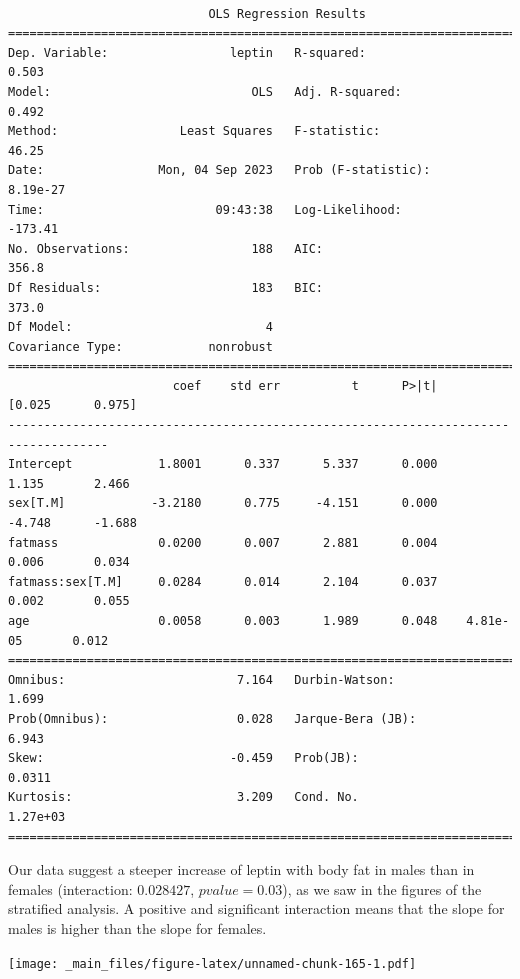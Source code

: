 \documentclass[
]{book}
\begin{document}
\begin{verbatim}

                            OLS Regression Results                            
==============================================================================
Dep. Variable:                 leptin   R-squared:                       0.503
Model:                            OLS   Adj. R-squared:                  0.492
Method:                 Least Squares   F-statistic:                     46.25
Date:                Mon, 04 Sep 2023   Prob (F-statistic):           8.19e-27
Time:                        09:43:38   Log-Likelihood:                -173.41
No. Observations:                 188   AIC:                             356.8
Df Residuals:                     183   BIC:                             373.0
Df Model:                           4                                         
Covariance Type:            nonrobust                                         
====================================================================================
                       coef    std err          t      P>|t|      [0.025      0.975]
------------------------------------------------------------------------------------
Intercept            1.8001      0.337      5.337      0.000       1.135       2.466
sex[T.M]            -3.2180      0.775     -4.151      0.000      -4.748      -1.688
fatmass              0.0200      0.007      2.881      0.004       0.006       0.034
fatmass:sex[T.M]     0.0284      0.014      2.104      0.037       0.002       0.055
age                  0.0058      0.003      1.989      0.048    4.81e-05       0.012
==============================================================================
Omnibus:                        7.164   Durbin-Watson:                   1.699
Prob(Omnibus):                  0.028   Jarque-Bera (JB):                6.943
Skew:                          -0.459   Prob(JB):                       0.0311
Kurtosis:                       3.209   Cond. No.                     1.27e+03
==============================================================================
\end{verbatim}

Our data suggest a steeper increase of leptin with body fat in males than in females (interaction: \(0.028427\), \(pvalue=0.03\)), as we saw in the figures of the stratified analysis. A positive and significant interaction means that the slope for males is higher than the slope for females.

\texttt{[image: \_main\_files/figure-latex/unnamed-chunk-165-1.pdf]}
\end{document}
